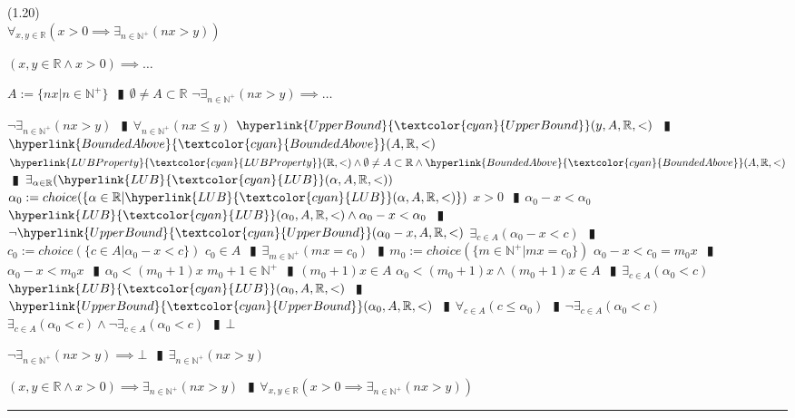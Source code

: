 \documentclass{book}
\newcommand{\wff}[1]{\hypertarget{#1}{\fbox{\textcolor{red}{$#1$}}\phantom{--}}}
\newcommand{\rf}[1]{\hyperlink{#1}{\textcolor{cyan}{#1}}}
\newcommand{\abr}{:=}
\newcommand{\pipe}{$\phantom{(}\vrectangleblack\phantom{)}$}
\newcommand{\pr}[1]{\left(#1\right)}
\begin{document}
(1.20) \\
\wff{ArchimedeanPropertyOfR} $\forall_{x, y \in \mathbb{R}}\pr{x > 0 \implies \exists_{n \in \mathbb{N}^+}(n x > y)}$
\begin{enumerate}
  \lit $(x, y \in \mathbb{R} \land x > 0) \implies \ldots$
  \begin{enumerate}
    \lit $A \abr \{n x | n \in \mathbb{N}^+\}$ \pipe $\emptyset \neq A \subset \mathbb{R}$
    \lit $\lnot \exists_{n \in \mathbb{N}^+}(n x > y) \implies \ldots$
    \begin{enumerate}
      \lit $\lnot \exists_{n \in \mathbb{N}^+}(n x > y)$ \pipe $\forall_{n \in \mathbb{N}^+}(n x \leq y)$
      \lit $\rf{UpperBound}(y, A, \mathbb{R}, <)$ \pipe $\rf{BoundedAbove}(A, \mathbb{R}, <)$
      \lit $\rf{LUBProperty}(\mathbb{R}, <) \land \emptyset \neq A \subset \mathbb{R} \land \rf{BoundedAbove}(A, \mathbb{R}, <)$ \pipe $\exists_{\alpha \in \mathbb{R}}(\rf{LUB}(\alpha, A, \mathbb{R}, <))$
      \lit $\alpha_0 \abr choice(\{\alpha \in \mathbb{R} | \rf{LUB}(\alpha, A, \mathbb{R}, <)\})$
      \lit $x > 0$ \pipe $\alpha_0 - x < \alpha_0$
      \lit $\rf{LUB}(\alpha_0, A, \mathbb{R}, <) \land \alpha_0 - x < \alpha_0$ \pipe $\lnot \rf{UpperBound}(\alpha_0 - x, A, \mathbb{R}, <)$
      \lit $\exists_{c \in A}(\alpha_0 - x < c)$ \pipe $c_0 \abr choice(\{c \in A | \alpha_0 - x < c\})$
      \lit $c_0 \in A$ \pipe $\exists_{m \in \mathbb{N}^+}(m x = c_0)$ \pipe $m_0 \abr choice(\{m \in \mathbb{N}^+ | m x = c_0\})$
      \lit $\alpha_0 - x < c_0 = m_0 x$ \pipe $\alpha_0 - x < m_0 x$ \pipe $\alpha_0 < (m_0 + 1) x$
      \lit $m_0 + 1 \in \mathbb{N}^+$ \pipe $(m_0 + 1) x \in A$
      \lit $\alpha_0 < (m_0 + 1) x \land (m_0 + 1) x \in A$ \pipe $\exists_{c \in A}(\alpha_0 < c)$
      \lit $\rf{LUB}(\alpha_0, A, \mathbb{R}, <)$ \pipe $\rf{UpperBound}(\alpha_0, A, \mathbb{R}, <)$ \pipe $\forall_{c \in A}(c \leq \alpha_0)$ \pipe $\lnot \exists_{c \in A}(\alpha_0 < c)$
      \lit $\exists_{c \in A}(\alpha_0 < c) \land \lnot \exists_{c \in A}(\alpha_0 < c)$ \pipe $\bot$
    \end{enumerate}
    \lit $\lnot \exists_{n \in \mathbb{N}^+}(n x > y) \implies \bot$ \pipe $\exists_{n \in \mathbb{N}^+}(n x > y)$
  \end{enumerate}
  \lit $(x, y \in \mathbb{R} \land x > 0) \implies \exists_{n \in \mathbb{N}^+}(n x > y)$ \pipe $\forall_{x, y \in \mathbb{R}}\pr{x > 0 \implies \exists_{n \in \mathbb{N}^+}(n x > y)}$
\end{enumerate} \vspace{.75mm} \hrule \vspace{.75mm} \ \\ 
\end{document}
